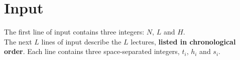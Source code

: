 \section*{Input}
{
\noindent The first line of input contains three integers: $N$, $L$ and $H$.\\

\noindent The next $L$ lines of input describe the $L$ lectures, \textbf{listed in chronological order}. Each line contains three space-separated integers, $t_i$, $h_i$ and $s_i$.
}